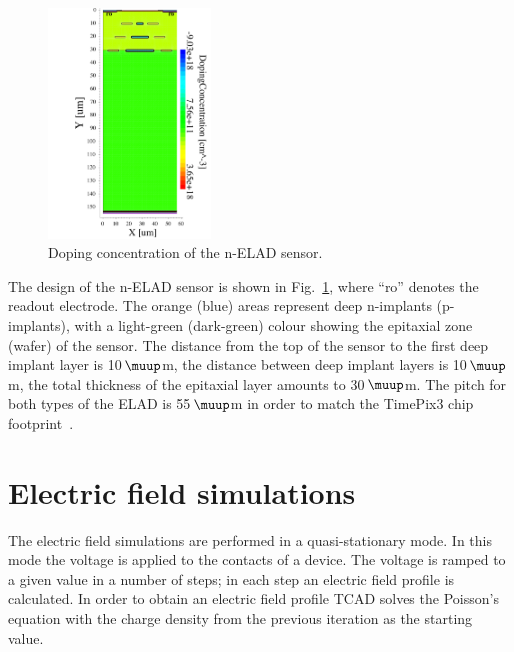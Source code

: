 \documentclass[a4paper,11pt]{article}
\begin{document}
\begin{figure}[t]
  \centering
  \includegraphics[height=6.1cm]{figures/nelad2.pdf}
  \caption{Doping concentration of the n-ELAD sensor.}
  \label{fig:geom}
\end{figure}

The design of the n-ELAD sensor is shown in Fig.~\ref{fig:geom}, where ``ro'' denotes the readout electrode.
The orange (blue) areas represent deep n-implants (p-implants), with a light-green (dark-green) colour showing the epitaxial zone (wafer) of the sensor. 
The distance from the top of the sensor to the first deep implant layer is 10\,$\muup$m, the distance between deep implant layers is 10\,$\muup$m, the total thickness of the epitaxial layer amounts to 30\,$\muup$m.
The pitch for both types of the ELAD is 55\,$\muup$m in order to match the TimePix3 chip footprint~\cite{tp3}.


\section{Electric field simulations}
\label{sec:ef}
The electric field simulations are performed in a quasi-stationary mode.
In this mode the voltage is applied to the contacts of a device.
The voltage is ramped to a given value in a number of steps; in each step an electric field profile is calculated. 
In order to obtain an electric field profile TCAD solves the Poisson's equation with the charge density from the previous iteration as the starting value.
\end{document}
